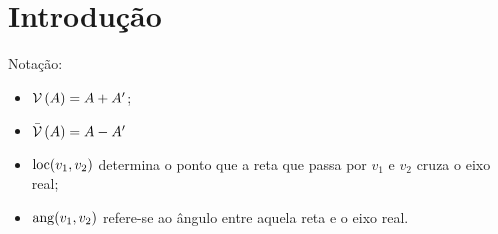 \chapter{Introdução}

Notação:
\begin{itemize}
  \item $\operatorname{\mathcal{V}}{(A)} = A + A'$;
  \item $\operatorname{\mathcal{\bar{V}}}{(A)} = A - A'$
  \item $\operatorname{loc}(v_1, v_2)$ determina o ponto que a reta que passa por $v_1$ e $v_2$ cruza o eixo real;
  \item $\operatorname{ang}(v_1, v_2)$ refere-se ao ângulo entre aquela reta e o eixo real.
\end{itemize}